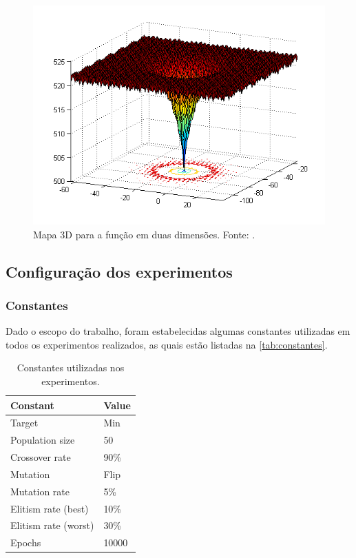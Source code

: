 \begin{figure}[!ht]%
    \centering
    \includegraphics[scale=0.5]{img/f5.png}
    \caption{Mapa 3D para a função  em duas dimensões. Fonte: .}%
    \label{fig:f5}
\end{figure}

\subsection{Configuração dos experimentos}


\subsubsection{Constantes}

Dado o escopo do trabalho, foram estabelecidas algumas constantes utilizadas em todos os experimentos realizados, as quais estão listadas na \autoref{tab:constantes}.

\begin{table}[htb]
    \center%
    \begin{tabular}{l l}
        \bottomrule
        \textbf{Constant}    & \textbf{Value} \\ \midrule
        Target               & Min            \\ \midrule
        Population size      & 50             \\ \midrule
        Crossover rate       & 90\%           \\ \midrule
        Mutation             & Flip           \\ \midrule
        Mutation rate        & 5\%            \\ \midrule
        Elitism rate (best)  & 10\%           \\ \midrule
        Elitism rate (worst) & 30\%           \\ \midrule
        Epochs               & 10000          \\ \toprule
    \end{tabular}
    \caption{Constantes utilizadas nos experimentos.}%
    \label{tab:constantes}
\end{table}

